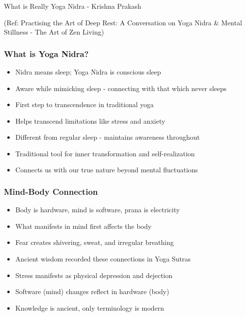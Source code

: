 \begin{frame}[fragile]\frametitle{}
\begin{center}
{\Large What is Really Yoga Nidra -  Krishna Prakash}

{\tiny (Ref: Practising the Art of Deep Rest: A Conversation on Yoga Nidra \& Mental Stillness - The Art of Zen Living)}
\end{center}
\end{frame}

\begin{frame}[fragile]\frametitle{What is Yoga Nidra?}
      \begin{itemize}
	\item Nidra means sleep; Yoga Nidra is conscious sleep
	\item Aware while mimicking sleep - connecting with that which never sleeps
	\item First step to transcendence in traditional yoga
	\item Helps transcend limitations like stress and anxiety
	\item Different from regular sleep - maintains awareness throughout
	\item Traditional tool for inner transformation and self-realization
	\item Connects us with our true nature beyond mental fluctuations
	  \end{itemize}
\end{frame}

\begin{frame}[fragile]\frametitle{Mind-Body Connection}
      \begin{itemize}
	\item Body is hardware, mind is software, prana is electricity
	\item What manifests in mind first affects the body
	\item Fear creates shivering, sweat, and irregular breathing
	\item Ancient wisdom recorded these connections in Yoga Sutras
	\item Stress manifests as physical depression and dejection
	\item Software (mind) changes reflect in hardware (body)
	\item Knowledge is ancient, only terminology is modern
	  \end{itemize}
\end{frame}

